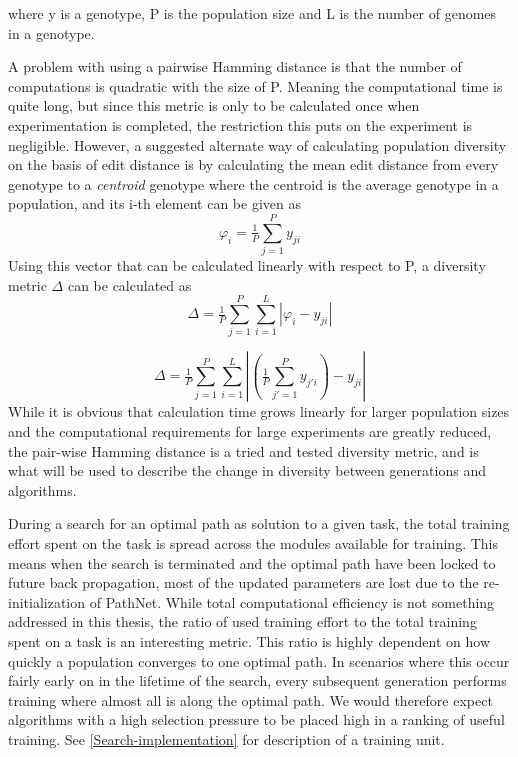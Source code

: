 where y is a genotype, P is the population size and L is the number of genomes in a genotype.

A problem with using a pairwise Hamming distance is that the number of computations is quadratic with the size of P. Meaning the computational time is quite long, but since this metric is only to be calculated once when experimentation is completed, the restriction this puts on the experiment is negligible. However, a suggested alternate way of calculating population diversity on the basis of edit distance is by calculating the mean edit distance from every genotype to a \textit{centroid} genotype where the centroid is the average genotype in a population, and its i-th element can be given as  
\begin{equation}
    \label{eq:centroid}
    \varphi_{i}=\tfrac{1}{P}\sum_{j=1}^{P}y_{ji}
\end{equation}
Using this vector that can be calculated linearly with respect to P, a diversity metric \(\Delta\) can be calculated as 
\begin{equation*}
    \Delta = \tfrac{1}{P}\sum_{j=1}^{P}\sum_{i=1}^{L}\left | \varphi_{i}-y_{ji} \right |
\end{equation*}

\begin{equation}
    \label{eq:homemade diversity}
    \Delta = \tfrac{1}{{P}}\sum_{j=1}^{P}\sum_{i=1}^{L}\left | (\tfrac{1}{{P}}\sum_{{j}'=1}^{P}y_{{j}'i})-y_{ji} \right |
\end{equation}
While it is obvious that calculation time grows linearly for larger population sizes and the computational requirements for large experiments are greatly reduced, the pair-wise Hamming distance is a tried and tested diversity metric, and is what will be used to describe the change in diversity between generations and algorithms. 

During a search for an optimal path as solution to a given task, the total training effort spent on the task is spread across the modules available for training. This means when the search is terminated and the optimal path have been locked to future back propagation, most of the updated parameters are lost due to the re-initialization of PathNet. While total computational efficiency is not something addressed in this thesis, the ratio of used training effort to the total training spent on a task is an interesting metric. This ratio is highly dependent on how quickly a population converges to one optimal path. In scenarios where this occur fairly early on in the lifetime of the search, every subsequent generation performs training where almost all is along the optimal path. We would therefore expect algorithms with a high selection pressure to be placed high in a ranking of useful training. See \ref{Search-implementation} for description of a training unit. 

